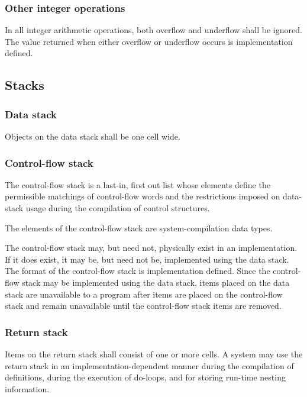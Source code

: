 \subsubsection{Other integer operations} %
\label{usage:intops}

In all integer arithmetic operations, both overflow and underflow
shall be ignored. The value returned when either overflow or
underflow occurs is implementation defined.

\subsection{Stacks} %

\subsubsection{Data stack} %
\label{usage:datastack}

Objects on the data stack shall be one cell wide.

\subsubsection{Control-flow stack} %
\label{usage:controlstack}

The control-flow stack is a last-in, first out list whose elements
define the permissible matchings of control-flow words and the
restrictions imposed on data-stack usage during the compilation of
control structures.

The elements of the control-flow stack are system-compilation data
types.

The control-flow stack may, but need not, physically exist in an
implementation. If it does exist, it may be, but need not be,
implemented using the data stack. The format of the control-flow
stack is implementation defined. Since the control-flow stack may
be implemented using the data stack, items placed on the data stack
are unavailable to a program after items are placed on the
control-flow stack and remain unavailable until the control-flow
stack items are removed.

\subsubsection{Return stack} %
\label{usage:returnstack}

Items on the return stack shall consist of one or more cells. A
system may use the return stack in an implementation-dependent
manner during the compilation of definitions, during the execution
of do-loops, and for storing run-time nesting information.

